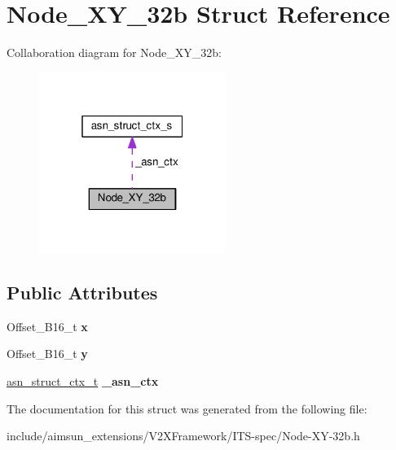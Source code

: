 \hypertarget{structNode__XY__32b}{}\section{Node\+\_\+\+X\+Y\+\_\+32b Struct Reference}
\label{structNode__XY__32b}


Collaboration diagram for Node\+\_\+\+X\+Y\+\_\+32b\+:\nopagebreak
\begin{figure}[H]
\begin{center}
\leavevmode
\includegraphics[width=172pt]{structNode__XY__32b__coll__graph}
\end{center}
\end{figure}
\subsection*{Public Attributes}
\begin{DoxyCompactItemize}
\item 
Offset\+\_\+\+B16\+\_\+t {\bfseries x}\hypertarget{structNode__XY__32b_a10d6d64454729d6beb68f04e12872cfb}{}\label{structNode__XY__32b_a10d6d64454729d6beb68f04e12872cfb}

\item 
Offset\+\_\+\+B16\+\_\+t {\bfseries y}\hypertarget{structNode__XY__32b_a1736a40447f7e2632cce8e00deaeadc4}{}\label{structNode__XY__32b_a1736a40447f7e2632cce8e00deaeadc4}

\item 
\hyperlink{structasn__struct__ctx__s}{asn\+\_\+struct\+\_\+ctx\+\_\+t} {\bfseries \+\_\+asn\+\_\+ctx}\hypertarget{structNode__XY__32b_a23503381ccd8732d002765f1eb88a9ae}{}\label{structNode__XY__32b_a23503381ccd8732d002765f1eb88a9ae}

\end{DoxyCompactItemize}


The documentation for this struct was generated from the following file\+:\begin{DoxyCompactItemize}
\item 
include/aimsun\+\_\+extensions/\+V2\+X\+Framework/\+I\+T\+S-\/spec/Node-\/\+X\+Y-\/32b.\+h\end{DoxyCompactItemize}
